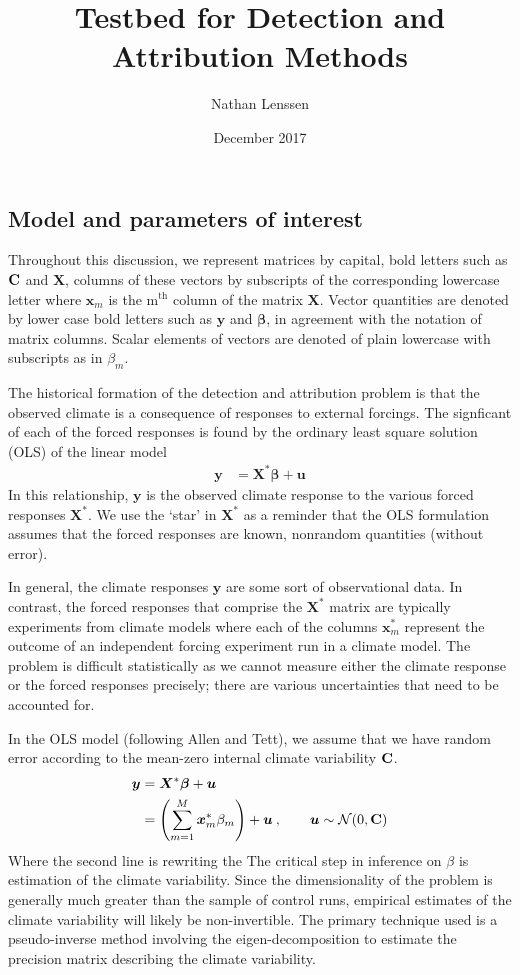 \documentclass[11pt]{article}
\title{Testbed for Detection and Attribution Methods}
\author{Nathan Lenssen}
\date{December 2017}
\newcommand{\C}{\ensuremath{\text{Cov}}}
\def\*#1{\bm{#1}}
\def\C{\textbf{\text{C}}}
\begin{document}
\maketitle

\subsection{Model and parameters of interest}
Throughout this discussion, we represent matrices by capital, bold letters such as $\C$ and $\*X$, columns of these vectors by subscripts of the corresponding lowercase letter where $\*x_m$ is the m$^{\text{th}}$ column of the matrix $\*X$. Vector quantities are denoted by lower case bold letters such as $\*y$ and $\*\beta$, in agreement with the notation of matrix columns. Scalar elements of vectors are denoted of plain lowercase with subscripts as in $\beta_m$. 

The historical formation of the detection and attribution problem is that the observed climate is a consequence of responses to external forcings. The signficant of each of the forced responses is found by the ordinary least square solution (OLS) of the linear model
\begin{align}
\*y &= \*X^* \*\beta + \* u
\end{align}
In this relationship, $\*y$ is the observed climate response to the various forced responses $ \*X^*$. We use the `star' in $\*X^*$ as a reminder that the OLS formulation assumes that the forced responses are known, nonrandom quantities (without error). 

In general, the climate responses $\*y$ are some sort of observational data. In contrast, the forced responses that comprise the $ \*X^*$ matrix are typically experiments from climate models where each of the columns $\*x^*_m$ represent the outcome of an independent forcing experiment run in a climate model. The problem is difficult statistically as we cannot measure either the climate response or the forced responses precisely; there are various uncertainties that need to be accounted for.

In the OLS model (following Allen and Tett), we assume that we have random error according to the mean-zero internal climate variability $\C$. 
\begin{align}
\*y &= \*X^* \*\beta + \*u\: \nonumber \\
&= \left (\sum_{m=1}^M \*x^*_m \beta_m \right ) + \*u \:, \qquad \* u \sim \mathcal{N}(0, \C)
\end{align}
Where the second line is rewriting the The critical step in inference on $\beta$ is estimation of the climate variability. Since the dimensionality of the problem is generally much greater than the sample of control runs, empirical estimates of the climate variability will likely be non-invertible. The primary technique used is a pseudo-inverse method involving the eigen-decomposition to estimate the precision matrix describing the climate variability.
\end{document}
